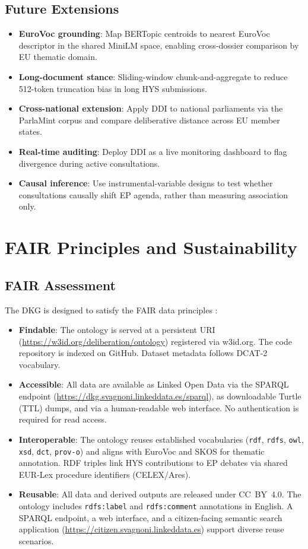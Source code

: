 \documentclass[sigconf,natbib]{acmart}
\begin{document}
\subsection{Future Extensions}

\begin{itemize}
  \item \textbf{EuroVoc grounding}: Map BERTopic centroids to nearest EuroVoc descriptor in the shared MiniLM space, enabling cross-dossier comparison by EU thematic domain.
  \item \textbf{Long-document stance}: Sliding-window chunk-and-aggregate to reduce 512-token truncation bias in long HYS submissions.
  \item \textbf{Cross-national extension}: Apply DDI to national parliaments via the ParlaMint corpus \citep{Erjavec2023} and compare deliberative distance across EU member states.
  \item \textbf{Real-time auditing}: Deploy DDI as a live monitoring dashboard to flag divergence during active consultations.
  \item \textbf{Causal inference}: Use instrumental-variable designs to test whether consultations causally shift EP agenda, rather than measuring association only.
\end{itemize}

\section{FAIR Principles and Sustainability}

\subsection{FAIR Assessment}
The DKG is designed to satisfy the FAIR data principles \citep{Wilkinson2016}:

\begin{itemize}
  \item \textbf{Findable}: The ontology is served at a persistent URI (\url{https://w3id.org/deliberation/ontology}) registered via w3id.org. The code repository is indexed on GitHub. Dataset metadata follows DCAT-2 vocabulary.
  \item \textbf{Accessible}: All data are available as Linked Open Data via the SPARQL endpoint (\url{https://dkg.svagnoni.linkeddata.es/sparql}), as downloadable Turtle (TTL) dumps, and via a human-readable web interface. No authentication is required for read access.
  \item \textbf{Interoperable}: The ontology reuses established vocabularies (\texttt{rdf}, \texttt{rdfs}, \texttt{owl}, \texttt{xsd}, \texttt{dct}, \texttt{prov-o}) and aligns with EuroVoc and SKOS for thematic annotation. RDF triples link HYS contributions to EP debates via shared EUR-Lex procedure identifiers (CELEX/Ares).
  \item \textbf{Reusable}: All data and derived outputs are released under CC~BY~4.0. The ontology includes \texttt{rdfs:label} and \texttt{rdfs:comment} annotations in English. A SPARQL endpoint, a web interface, and a citizen-facing semantic search application (\url{https://citizen.svagnoni.linkeddata.es}) support diverse reuse scenarios.
\end{itemize}
\end{document}
